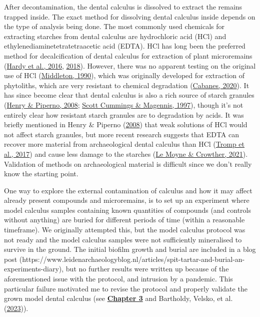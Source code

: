 \documentclass[
  b5paper,
]{book}
\begin{document}
After decontamination, the dental calculus is dissolved to extract the
remains trapped inside. The exact method for dissolving dental calculus
inside depends on the type of analysis being done. The most commonly
used chemicals for extracting starches from dental calculus are
hydrochloric acid (HCl) and ethylenediaminetetratetraacetic acid (EDTA).
HCl has long been the preferred method for decalcification of dental
calculus for extraction of plant microremains
(\protect\hyperlink{ref-hardyDentalCalculus2016}{Hardy et al., 2016},
\protect\hyperlink{ref-hardyRecoveringInformation2018}{2018}). However,
there was no apparent testing on the original use of HCl
(\protect\hyperlink{ref-middletonImprovedMethod1990}{Middleton, 1990}),
which was originally developed for extraction of phytoliths, which are
very resistant to chemical degradation
(\protect\hyperlink{ref-cabanesPhytolithAnalysis2020}{Cabanes, 2020}).
It has since become clear that dental calculus is also a rich source of
starch granules (\protect\hyperlink{ref-henryCalculusSyria2008}{Henry \&
Piperno, 2008}; \protect\hyperlink{ref-cummingsMayanCalculus1997}{Scott
Cummings \& Magennis, 1997}), though it's not entirely clear how
resistant starch granules are to degradation by acids. It was briefly
mentioned in Henry \& Piperno
(\protect\hyperlink{ref-henryCalculusSyria2008}{2008}) that weak
solutions of HCl would not affect starch granules, but more recent
research suggests that EDTA can recover more material from
archaeological dental calculus than HCl
(\protect\hyperlink{ref-trompEDTACalculus2017}{Tromp et al., 2017}) and
cause less damage to the starches
(\protect\hyperlink{ref-lemoyneCalculusPretreatments2021}{Le Moyne \&
Crowther, 2021}). Validation of methods on archaeological material is
difficult since we don't really know the starting point.

One way to explore the external contamination of calculus and how it may
affect already present compounds and microremains, is to set up an
experiment where model calculus samples containing known quantities of
compounds (and controls without anything) are buried for different
periods of time (within a reasonable timeframe). We originally attempted
this, but the model calculus protocol was not ready and the model
calculus samples were not sufficiently mineralised to survive in the
ground. The initial biofilm growth and burial are included in a blog
post
(https://www.leidenarchaeologyblog.nl/articles/spit-tartar-and-burial-an-experiments-diary),
but no further results were written up because of the aforementioned
issue with the protocol, and intrusion by a pandemic. This particular
failure motivated me to revise the protocol and properly validate the
grown model dental calculus (see
\protect\hyperlink{byoc-valid}{\textbf{Chapter 3}} and Bartholdy,
Velsko, et al.
(\protect\hyperlink{ref-bartholdyAssessingValidity2023}{2023})).
\end{document}
